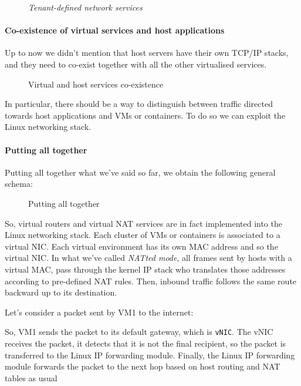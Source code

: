 \begin{figure}[ht!]
    \centering
    \caption{\emph{Tenant-defined network services}}
\end{figure}

\paragraph{Co-existence of virtual services and host applications}
Up to now we didn't mention that host servers have their own TCP/IP stacks, and
they need to co-exist together with all the other virtualised services.

\begin{figure}[h!]
    \centering
    \caption{Virtual and host services co-existence}
\end{figure}

\noindent
In particular, there should be a way to distinguish between traffic directed towards
host applications and VMs or containers. To do so we can exploit the Linux
networking stack.

\paragraph{Putting all together}
Putting all together what we've said so far, we obtain the following general schema:

\begin{figure}[h!]
    \centering
    \caption{Putting all together}
\end{figure}

\noindent
So, virtual routers and virtual NAT services are in fact implemented into the
Linux networking stack. Each cluster of VMs or containers is associated to a
virtual NIC. Each virtual environment has its own MAC address and so the virtual
NIC. In what we've called \emph{NATted mode}, all frames sent by hosts with
a virtual MAC, pass through the kernel IP stack who translates those addresses
according to pre-defined NAT rules. Then, inbound traffic follows the same route
backward up to its destination.

\begin{eg}
    Let's consider a packet sent by VM1 to the internet:

    \begin{figure}[h!]
        \centering
        \hfill
    \end{figure}

    \noindent
    So, VM1 sends the packet to its default gateway, which is \texttt{vNIC}. 
    The vNIC receives the packet, it detects that it is not the final recipient,
    so the packet is transferred to the Linux IP forwarding module. Finally,
    the Linux IP forwarding module forwards the packet to the next hop based on
    host routing and NAT tables as usual
\end{eg}

